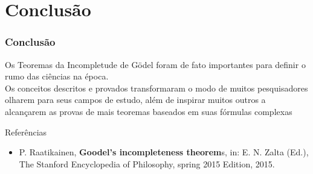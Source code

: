 \documentclass{beamer}
\begin{document}
%
%

\section{Conclusão}
\begin{frame}
    \frametitle{Conclusão}

    Os Teoremas da Incompletude de Gödel foram de fato importantes para definir o rumo das ciências na época.\\
    
    Os conceitos descritos e provados transformaram o modo de muitos pesquisadores olharem para seus campos de estudo, além de inspirar muitos outros a alcançarem as provas de mais teoremas baseados em suas fórmulas complexas
    
\end{frame}

\begin{frame}{Referências}

    \begin{itemize}
        \item P. Raatikainen, \textbf{Goodel’s incompleteness theorem}s, in:  E. N. Zalta (Ed.), The Stanford Encyclopedia of Philosophy, spring 2015 Edition, 2015.
    \end{itemize}
     
\end{frame}
\end{document}
